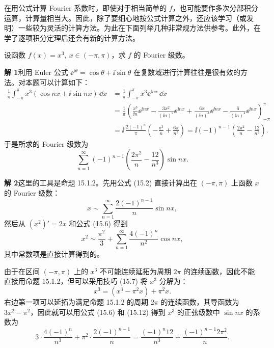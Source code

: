 在用公式计算 Fourier 系数时，即使对于相当简单的 $f$，也可能要作多次分部积分运算，计算量相当大。因此，除了要细心地按公式计算之外，还应该学习（或发明）一些较为灵活的计算方法。为此在下面列举几种非常规方法供参考。此外，在学了逐项积分定理后还会有新的计算方法。

\begin{xexample}[15.1.2]
设函数 $f(x)=x^3,\ x\in(-\pi,\pi)$，求 $f$ 的 Fourier 级数。
\end{xexample}
\begin{xsolution}
\textbf{解 1}\quad 利用 Euler 公式 $\ee^{\ii\theta}=\cos\theta+\ii\sin\theta$ 在复数域进行计算往往是很有效的方法。对本题可以计算如下：
\begin{align*}
  \frac1\pi\int_{-\pi}^{\pi}x^3(\cos nx+\ii\sin nx)\,\dd x
  &=\frac1\pi\int_{-\pi}^{\pi}x^3\ee^{\ii nx}\,\dd x\\
  &=\frac1\pi\left(
    \frac{x^3}{\ii n}\ee^{\ii nx}
    -\frac{3x^2}{(\ii n)^2}\ee^{\ii nx}
    +\frac{6x}{(\ii n)^3}\ee^{\ii nx}
    -\frac6{(\ii n)^4}\ee^{\ii nx}
  \right)_{-\pi}^{\pi}\\
  &=\ii\,\frac{2(-1)^n}{\pi}\left(-\frac{\pi^3}{n}+\frac{6\pi}{n^3}\right)
   =\ii(-1)^{n-1}\left(\frac{2\pi^2}{n}-\frac{12}{n^3}\right).
\end{align*}
于是所求的 Fourier 级数为
\[
  \sum_{n=1}^{\infty}(-1)^{n-1}\left(\frac{2\pi^2}{n}-\frac{12}{n^3}\right)\sin nx.
\]

\textbf{解 2}\quad 这里的工具是命题 15.1.2。先用公式 (15.2) 直接计算出在 $(-\pi,\pi)$ 上函数 $x$ 的 Fourier 级数：
\begin{equation}
  x\sim\sum_{n=1}^{\infty}\frac{2(-1)^{n-1}}{n}\sin nx,
  \tag{15.12}
  \label{eq:15.12}
\end{equation}
然后从 $(x^2)'=2x$ 和公式 (15.6) 得到
\begin{equation}
  x^2\sim\frac{\pi^2}{3}+\sum_{n=1}^{\infty}\frac{4(-1)^n}{n^2}\cos nx,
  \tag{15.13}
  \label{eq:15.13}
\end{equation}
其中常数项是直接计算得到的。

由于在区间 $(-\pi,\pi)$ 上的 $x^3$ 不可能连续延拓为周期 $2\pi$ 的连续函数，因此不能直接用命题 15.1.2，但可以采用技巧 (15.7) 将 $x^3$ 分解为：
\begin{equation}
  x^3=(x^3-\pi^2x)+\pi^2x.
  \tag{15.14}
  \label{eq:15.14}
\end{equation}
右边第一项可以延拓为满足命题 15.1.2 的周期 $2\pi$ 的连续函数，其导函数为 $3x^2-\pi^2$，因此就可以用公式 (15.6) 和 (15.12) 得到 $x^3$ 的正弦级数中 $\sin nx$ 的系数为
\[
  3\cdot\frac{4(-1)^n}{n^3}+\pi^2\cdot\frac{2(-1)^{n-1}}{n}
  =\frac{(-1)^n12}{n^3}+\frac{(-1)^{n-1}2\pi^2}{n}.
\]
\end{xsolution}

